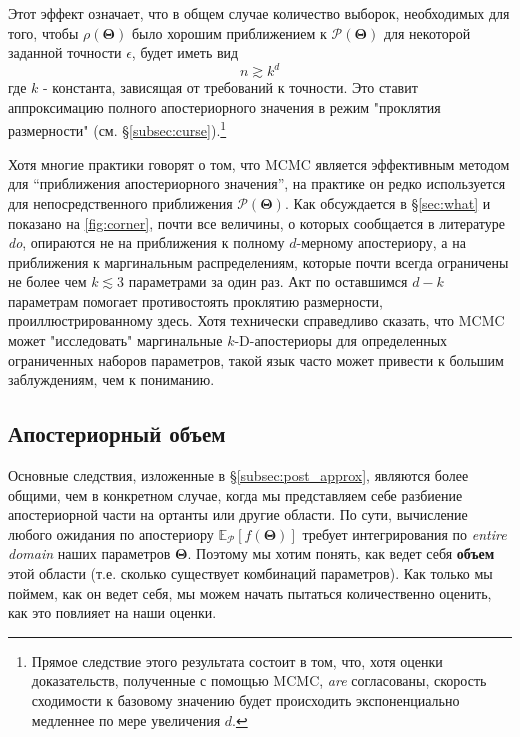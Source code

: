 \documentclass[12pt, titlepage]{article}
\newcommand{\meanwrt}[2]{\ensuremath{\mathbb{E}_{{#2}}\left[{#1}\right]}}
\newcommand{\params}{\ensuremath{\boldsymbol\Theta}}
\newcommand{\posterior}{\ensuremath{\mathcal{P}}}
\begin{document}
Этот эффект означает, что в общем случае количество выборок, необходимых для того, чтобы $\rho(\params)$ было хорошим приближением к $\posterior(\params)$ для некоторой заданной точности $\epsilon$, будет иметь вид
\begin{equation}
    n \gtrsim k^d
\end{equation}
где $k$ - константа, зависящая от требований к точности. Это ставит аппроксимацию полного апостериорного значения в режим "проклятия размерности" (см. \S\ref{subsec:curse}).\footnote{Прямое следствие этого результата состоит в том, что, хотя оценки доказательств, полученные с помощью MCMC, \textit{are} согласованы, скорость сходимости к базовому значению будет происходить экспоненциально медленнее по мере увеличения $d$.}

Хотя многие практики говорят о том, что MCMC является эффективным методом для ``приближения апостериорного значения'', на практике он редко используется для непосредственного приближения $\posterior(\params)$. Как обсуждается в \S\ref{sec:what} и показано на {\color{red} \autoref{fig:corner}}, почти все величины, о которых сообщается в литературе \textit{do}, опираются не на приближения к полному $d$-мерному апостериору, а на приближения к маргинальным распределениям, которые почти всегда ограничены не более чем $k\lesssim3$ параметрами за один раз. Акт по оставшимся $d-k$ параметрам помогает противостоять проклятию размерности, проиллюстрированному здесь. Хотя технически справедливо сказать, что MCMC может "исследовать" маргинальные $k$-D-апостериоры для определенных ограниченных наборов параметров, такой язык часто может привести к большим заблуждениям, чем к пониманию.

\subsection{Апостериорный объем} \label{subsec:volume}

Основные следствия, изложенные в \S\ref{subsec:post_approx}, являются более общими, чем в конкретном случае, когда мы представляем себе разбиение апостериорной части на ортанты или другие области. По сути, вычисление любого ожидания по апостериору $\meanwrt{f(\params)}{\posterior}$ требует интегрирования по \textit{entire domain} наших параметров $\params$. Поэтому мы хотим понять, как ведет себя \textbf{объем} этой области (т.е. сколько существует комбинаций параметров). Как только мы поймем, как он ведет себя, мы можем начать пытаться количественно оценить, как это повлияет на наши оценки. 
\end{document}
